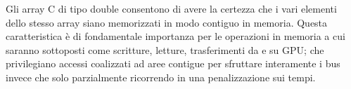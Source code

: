\documentclass[12pt,a4paper]{report}
\begin{document}
\begin{figure}[H]
\centering
\begin{floatrow}[1]
\end{floatrow}
\end{figure}
\begin{figure}[H]
\centering
\begin{floatrow}[1]
\end{floatrow}
\end{figure} 

Gli array C di tipo double consentono di avere la certezza che i vari elementi dello stesso array siano memorizzati in modo contiguo in memoria. Questa caratteristica è di fondamentale importanza per le operazioni in memoria a cui saranno sottoposti come scritture, letture, trasferimenti da e su GPU; che privilegiano accessi coalizzati ad aree contigue per sfruttare interamente i bus invece che solo parzialmente ricorrendo in una penalizzazione sui tempi. \newpage
\end{document}
